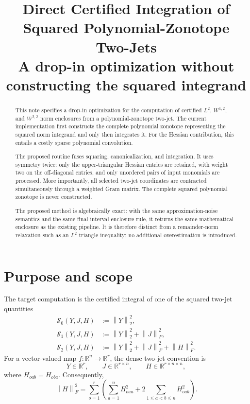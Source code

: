 \documentclass[11pt]{article}
\title{Direct Certified Integration of Squared Polynomial-Zonotope Two-Jets\\
\large A drop-in optimization without constructing the squared integrand}
\author{}
\date{}
\newcommand{\R}{\mathbb{R}}
\newcommand{\norm}[1]{\left\lVert #1\right\rVert}
\begin{document}
\maketitle

\begin{abstract}
This note specifies a drop-in optimization for the computation of certified
\(L^2\), \(W^{1,2}\), and \(W^{2,2}\) norm enclosures from a
polynomial-zonotope two-jet.  The current implementation first constructs the
complete polynomial zonotope representing the squared norm integrand and only
then integrates it.  For the Hessian contribution, this entails a costly sparse
polynomial convolution.

The proposed routine fuses squaring, canonicalization, and integration.  It
uses symmetry twice: only the upper-triangular Hessian entries are retained,
with weight two on the off-diagonal entries, and only unordered pairs of input
monomials are processed.  More importantly, all selected two-jet coordinates
are contracted simultaneously through a weighted Gram matrix.  The complete
squared polynomial zonotope is never constructed.

The proposed method is algebraically exact: with the same approximation-noise
semantics and the same final interval-enclosure rule, it returns the same
mathematical enclosure as the existing pipeline.  It is therefore distinct
from a remainder-norm relaxation such as an \(L^2\) triangle inequality; no
additional overestimation is introduced.
\end{abstract}

\tableofcontents

\section{Purpose and scope}

The target computation is the certified integral of one of the squared
two-jet quantities
\begin{align}
    \mathcal{S}_{0}(Y,J,H)
    &:= \norm{Y}_2^2, \label{eq:s0}\\
    \mathcal{S}_{1}(Y,J,H)
    &:= \norm{Y}_2^2+\norm{J}_F^2, \label{eq:s1}\\
    \mathcal{S}_{2}(Y,J,H)
    &:= \norm{Y}_2^2+\norm{J}_F^2+\norm{H}_F^2. \label{eq:s2}
\end{align}
For a vector-valued map \(f:\R^n\to\R^r\), the dense two-jet convention is
\[
    Y\in\R^r,\qquad
    J\in\R^{r\times n},\qquad
    H\in\R^{r\times n\times n},
\]
where \(H_{oab}=H_{oba}\).  Consequently,
\begin{equation}
    \norm{H}_F^2
    =
    \sum_{o=1}^{r}
    \left(
        \sum_{a=1}^{n}H_{oaa}^2
        +2\sum_{1\leq a<b\leq n}H_{oab}^2
    \right).
    \label{eq:hessian-symmetric-square}
\end{equation}
\end{document}
